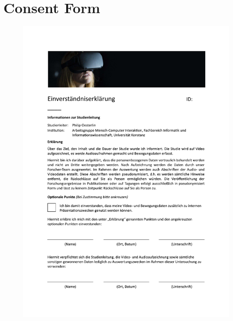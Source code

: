 \section{Consent Form}
\begin{figure}[hbt!]
\centering
\includegraphics[width=\textwidth]{figures/Appendix/consent form.pdf}
\end{figure}

